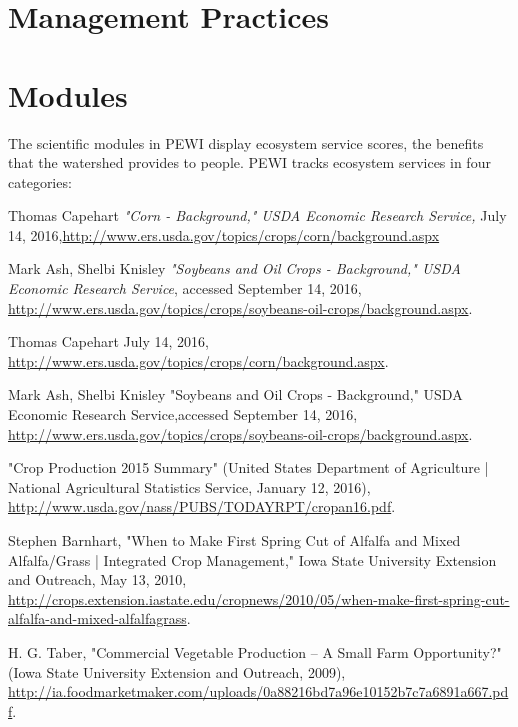 \documentclass[11pt]{article}
\begin{document}
\newpage
\section{Management Practices}


\newpage
\section{Modules}
The scientific modules in PEWI display ecosystem service scores, the benefits that the watershed provides to people. PEWI tracks ecosystem services in four categories: 

\cleardoublepage


\begin{thebibliography}{1}

   Thomas Capehart {\em "Corn - Background," USDA Economic Research Service, }July 14, 2016,\url{http://www.ers.usda.gov/topics/crops/corn/background.aspx}

    Mark Ash, Shelbi Knisley {\em "Soybeans and Oil Crops - Background," USDA Economic Research Service}, accessed September 14, 2016, \url{http://www.ers.usda.gov/topics/crops/soybeans-oil-crops/background.aspx}.

   Thomas Capehart July 14, 2016, \url{http://www.ers.usda.gov/topics/crops/corn/background.aspx}.

  Mark Ash, Shelbi Knisley  "Soybeans and Oil Crops - Background," USDA Economic Research Service,accessed September 14, 2016, \url{http://www.ers.usda.gov/topics/crops/soybeans-oil-crops/background.aspx}.
  
  "Crop Production 2015 Summary" (United States Department of Agriculture | National Agricultural Statistics Service, January 12, 2016), \url{http://www.usda.gov/nass/PUBS/TODAYRPT/cropan16.pdf}.
  
  Stephen Barnhart, "When to Make First Spring Cut of Alfalfa and Mixed Alfalfa/Grass | Integrated Crop Management," Iowa State University Extension and Outreach, May 13, 2010, \url{http://crops.extension.iastate.edu/cropnews/2010/05/when-make-first-spring-cut-alfalfa-and-mixed-alfalfagrass}.
  
  H. G. Taber, "Commercial Vegetable Production – A Small Farm Opportunity?" (Iowa State University Extension and Outreach, 2009), \url{http://ia.foodmarketmaker.com/uploads/0a88216bd7a96e10152b7c7a6891a667.pdf}.
  

\end{thebibliography}
\end{document}
